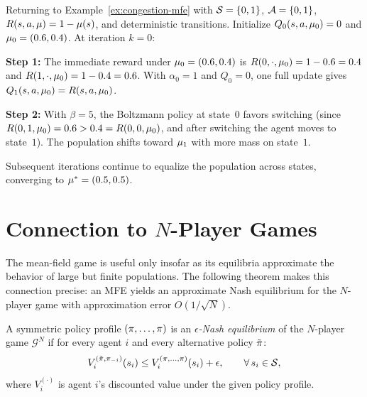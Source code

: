 \documentclass[11pt,a4paper]{article}
\begin{document}
\begin{example}
\label{ex:mf-q-congestion}
Returning to Example~\ref{ex:congestion-mfe} with $\mathcal{S} = \{0,1\}$,
$\mathcal{A} = \{0,1\}$, $R(s,a,\mu) = 1 - \mu(s)$,
and deterministic transitions.  Initialize $Q_0(s,a,\mu_0)
= 0$ and $\mu_0 = (0.6, 0.4)$.  At iteration $k=0$:

\textbf{Step 1:} The immediate reward under $\mu_0 =
(0.6, 0.4)$ is $R(0, \cdot, \mu_0) = 1 - 0.6 = 0.4$ and
$R(1, \cdot, \mu_0) = 1 - 0.4 = 0.6$.  With $\alpha_0 = 1$
and $Q_0 = 0$, one full update gives $Q_1(s,a,\mu_0) =
R(s,a,\mu_0)$.

\textbf{Step 2:} With $\beta = 5$, the Boltzmann policy at state~$0$
favors switching (since $R(0, 1, \mu_0) = 0.6 > 0.4 =
R(0, 0, \mu_0)$, and after switching the agent moves to
state~$1$).  The population shifts toward $\mu_1$ with more
mass on state~$1$.

Subsequent iterations continue to equalize the population across
states, converging to $\mu^* = (0.5, 0.5)$.
\end{example}


\section{Connection to $N$-Player Games}
\label{sec:n-player-connection}

The mean-field game is useful only insofar as its equilibria
approximate the behavior of large but finite populations.  The
following theorem makes this connection precise: an MFE yields an
approximate Nash equilibrium for the $N$-player game with
approximation error $O(1/\sqrt{N})$.

\begin{definition}
\label{def:eps-ne}
A symmetric policy profile $(\pi, \ldots, \pi)$ is an
\emph{$\epsilon$-Nash equilibrium} of the $N$-player game
$\mathcal{G}^N$ if for every agent $i$ and every alternative
policy $\tilde{\pi}$:
\[
  V_i^{(\tilde{\pi}, \pi_{-i})}(s_i)
  \leq V_i^{(\pi, \ldots, \pi)}(s_i) + \epsilon,
  \qquad \forall\, s_i \in \mathcal{S},
\]
where $V_i^{(\cdot)}$ is agent $i$'s discounted value under the
given policy profile.
\end{definition}
\end{document}
